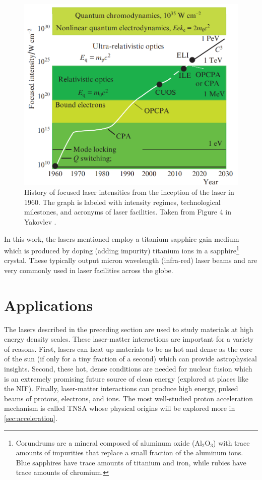 \begin{figure}
	\centering
	\includegraphics[width=0.75\linewidth]{planning/images/laser_history.PNG}
	\caption{History of focused laser intensities from the inception of the laser in 1960. The graph is labeled with intensity regimes, technological milestones, and acronyms of laser facilities. Taken from Figure 4 in Yakovlev \cite{Yakovlev_2014_QE}.}
	\label{fig:laser_history}
\end{figure}

In this work, the lasers mentioned employ a titanium sapphire gain medium which is produced by doping (adding impurity) titanium ions in a sapphire\footnote{Corundrums are a mineral composed of aluminum oxide ($\text{Al}_2\text{O}_3$) with trace amounts of impurities that replace a small fraction of the aluminum ions. Blue sapphires have trace amounts of titanium and iron, while rubies have trace amounts of chromium.} crystal. These typically output micron wavelength (infra-red) laser beams and are very commonly used in laser facilities across the globe.


\section{Applications}

The lasers described in the preceding section are used to study materials at high energy density scales. These laser-matter interactions are important for a variety of reasons. First, lasers can heat up materials to be as hot and dense as the core of the sun (if only for a tiny fraction of a second) which can provide astrophysical insights. Second, these hot, dense conditions are needed for nuclear fusion which is an extremely promising future source of clean energy (explored at places like the \gls{NIF}). Finally, laser-matter interactions can produce high energy, pulsed beams of protons, electrons, and ions. The most well-studied proton acceleration mechanism is called \gls{TNSA} whose physical origins will be explored more in \autoref{sec:acceleration}. 

